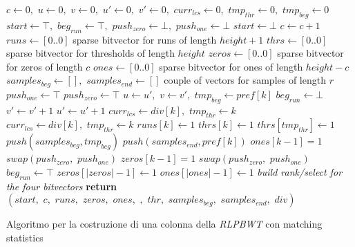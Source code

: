 


\begin{algorithm}
  \scriptsize
  \begin{algorithmic}[1]
    \State $c\gets 0,\,\,u\gets 0,\,\,v\gets 0,\,\,u'\gets 0,\,\, v'\gets
    0,\,\,curr_{lcs}\gets 0,\,\,tmp_{thr}\gets 0,\,\,tmp_{beg}\gets 0$
    \State $start \gets \top,\,\,beg_{run}\gets \top,\,\,push_{zero}\gets
    \bot,\,\,push_{one}\gets \bot$
    \For {\textit{every} $k\in\left[0,\,\, height\right)$}
    \State $start \gets \bot$
    \EndIf
    \State $c\gets c+1$
    \EndIf
    \EndFor
    \State $runs\gets[0..0]$
    \Comment sparse bitvector for runs of length $height+1$
    \State $thrs\gets[0..0]$
    \Comment sparse bitvector for thresholds of length $height$
    \State $zeros\gets[0..0]$
    \Comment sparse bitvector for zeros of length $c$
    \State $ones\gets[0..0]$
    \Comment sparse bitvector for ones of length $height-c$
    \State $samples_{beg} \gets [],\,\,samples_{end}\gets []$
    \Comment couple of vectors for samples of length $r$
    \State $push_{one}\gets \top$
    \Else
    \State $push_{zero}\gets \top$
    \EndIf
    \For {\textit{every} $k\in\left[0,\,\, height\right)$}
    \State $u\gets u',\,\,v\gets v',\,\,tmp_{beg}\gets pref[k]$
    \State $beg_{run}\gets \bot$
    \EndIf
    \State $v'\gets v'+1$
    \Else
    \State $u'\gets u'+1$
    \EndIf
    \State $curr_{lcs}\gets div[k],\,\,tmp_{thr}\gets k$
    \EndIf
    \State $curr_{lcs}\gets div[k],\,\,tmp_{thr}\gets k$
    \EndIf
    \State $runs[k]\gets 1$
    \State $thrs[k]\gets 1$
    \Else
    \State $thrs[tmp_{thr}]\gets 1$
    \EndIf
    \State $push(samples_{beg}, tmp_{beg})$
    \State $push(samples_{end}, pref[k])$
    \State $ones[k-1]=1$
    \EndIf
    \State $swap(push_{zero},\,\,push_{one})$
    \Else
    \State $zeros[k-1]=1$
    \EndIf
    \State $swap(push_{zero},\,\,push_{one})$
    \EndIf
    \State $beg_{run}\gets \top$
    \EndIf
    \EndFor
    \State $zeros[|zeros|-1]\gets 1$
    \EndIf
    \State $ones[|ones|-1]\gets 1$
    \EndIf
    \State \textit{build rank/select for the four bitvectors}
    \State \textbf{return}
    $(start,\,\,c,\,\,runs,\,\,zeros,\,\,ones,\,\,,\,\,thr,\,\,samples_{beg},\,\,
    samples_{end},\,\,div)$  
    \EndFunction
  \end{algorithmic}
  \caption{{\footnotesize{Algoritmo per la costruzione di una colonna della
  \textit{RLPBWT} con matching statistics}}}
  \label{algo:cosms}
\end{algorithm}



